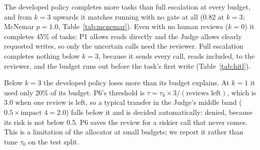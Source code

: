 \documentclass[11pt,a4paper]{article}
\begin{document}
\begin{table}[h]
  \centering
  \small
  \caption{TCR@$k$ by policy (test split, 60 runs per cell). The $k = 3$
    column is the headline batch; the others are the $k$ sweep.}
  \label{tab:tcr}
\end{table}

The developed policy completes more tasks than full escalation at every
budget, and from $k = 3$ upwards it matches running with no gate at all
(0.82 at $k = 3$; McNemar $p = 1.0$, Table~\ref{tab:mcnemar}). Even with no
human reviews ($k = 0$) it completes 45\% of tasks: P1 allows reads directly
and the Judge allows clearly requested writes, so only the uncertain calls
need the reviewer. Full escalation completes nothing below $k = 3$, because
it sends every call, reads included, to the reviewer, and the budget runs out
before the task's first write (Table~\ref{tab:hitl}).

Below $k = 3$ the developed policy loses more than its budget explains. At
$k = 1$ it used only 20\% of its budget. P6's threshold is
$\tau = \tau_0 \times 3 / (\text{reviews left})$, which is 3.0 when one review
is left, so a typical transfer in the Judge's middle band
($0.5 \times \text{impact } 4 = 2.0$) falls below it and is decided
automatically: denied, because its risk is not below 0.5. P6 saves the review
for a riskier call that never comes. This is a limitation of the allocator at
small budgets; we report it rather than tune $\tau_0$ on the test split.
\end{document}
